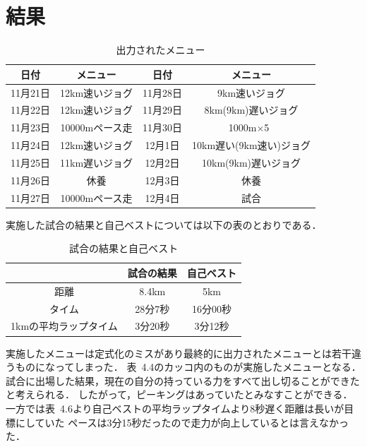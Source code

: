 \documentclass[12pt,fleqn]{jreport}
\begin{document}
\section{結果}
\vspace{1cm}
\begin{longtable}{|c|c|c|c|}
  \caption{出力されたメニュー}                                   \\
  \hline
  日付     & メニュー       & 日付     & メニュー                \\
  \hline
  11月21日 & 12km速いジョグ & 11月28日 & 9km速いジョグ           \\
  \hline
  11月22日 & 12km速いジョグ & 11月29日 & 8km(9km)遅いジョグ      \\
  \hline
  11月23日 & 10000mペース走 & 11月30日 & 1000m$\times$5\         \\
  \hline
  11月24日 & 12km速いジョグ & 12月1日  & 10km遅い(9km速い)ジョグ \\
  \hline
  11月25日 & 11km遅いジョグ & 12月2日  & 10km(9km)遅いジョグ     \\
  \hline
  11月26日 & 休養           & 12月3日  & 休養                    \\
  \hline
  11月27日 & 10000mペース走 & 12月4日  & 試合                    \\
  \hline
\end{longtable}
実施した試合の結果と自己ベストについては以下の表のとおりである．
\begin{table}[H]
  \caption{試合の結果と自己ベスト}
  \begin{center}
    \begin{tabular}{|c|c|c|}
      \hline
                            & 試合の結果 & 自己ベスト \\
      \hline
      距離                  & 8.4km      & 5km        \\
      \hline
      タイム                & 28分7秒    & 16分00秒   \\
      \hline
      1kmの平均ラップタイム & 3分20秒    & 3分12秒    \\
      \hline
    \end{tabular}
  \end{center}
\end{table}
実施したメニューは定式化のミスがあり最終的に出力されたメニューとは若干違うものになってしまった．
表\ 4.4のカッコ内のものが実施したメニューとなる．試合に出場した結果，現在の自分の持っている力をすべて出し切ることができたと考えられる．
したがって，ピーキングはあっていたとみなすことができる．一方では表\ 4.6より自己ベストの平均ラップタイムより8秒遅く距離は長いが目標にしていた
ペースは3分15秒だったので走力が向上しているとは言えなかった．
\newpage
\end{document}

